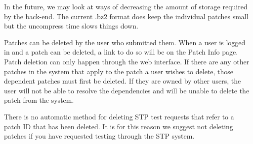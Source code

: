 In the future, we may look at ways of decreasing the amount of storage required 
by the back-end. The current .bz2 format does keep the individual patches small but the 
uncompress time slows things down.

Patches can be deleted by the user who submitted them.  When a user is logged in and a
patch can be deleted, a link to do so will be on the Patch Info page.  Patch deletion 
can only happen through the web interface.  If there are any other patches in the system 
that apply to the patch a user wishes to delete, those dependent patches must first be 
deleted.  If they are owned by other users, the user will not be able to resolve the
dependencies and will be unable to delete the patch from the system.

There is no automatic method for deleting STP test requests that refer to a patch ID 
that has been deleted.  It is for this reason we suggest not deleting patches if you have 
requested testing through the STP system.
